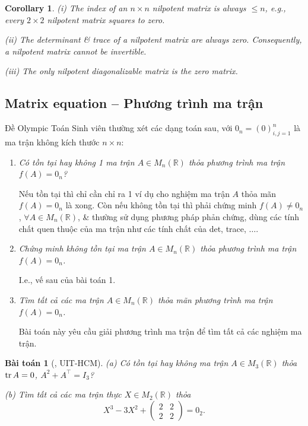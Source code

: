 \documentclass{article}
\newtheorem{baitoan}{Bài toán}
\newtheorem{corollary}{Corollary}
\begin{document}
\begin{corollary}
	(i) The index of an $n\times n$ nilpotent matrix is always $\le n$, e.g., every $2\times2$ nilpotent matrix squares to zero.
	\item(ii) The determinant \& trace of a nilpotent matrix are always zero. Consequently, a nilpotent matrix cannot be invertible.
	\item(iii) The only nilpotent diagonalizable matrix is the zero matrix.
\end{corollary}


\subsection{Matrix equation -- Phương trình ma trận}
Đề Olympic Toán Sinh viên thường xét các dạng toán sau, với $0_n = (0)_{i,j=1}^n$ là ma trận không kích thước $n\times n$:
\begin{enumerate}
	\item {\it Có tồn tại hay không 1 ma trận $A\in M_n(\mathbb{R})$ thỏa phương trình ma trận $f(A) = 0_n$?}
	
	Nếu tồn tại thì chỉ cần chỉ ra 1 ví dụ cho nghiệm ma trận $A$ thỏa mãn $f(A) = 0_n$ là xong. Còn nếu không tồn tại thì phải chứng minh $f(A)\ne0_n$, $\forall A\in M_n(\mathbb{R})$, \& thường sử dụng phương pháp phản chứng, dùng các tính chất quen thuộc của ma trận như các tính chất của det, trace, $\ldots$.
	\item {\it Chứng minh không tồn tại ma trận $A\in M_n(\mathbb{R})$ thỏa phương trình ma trận $f(A) = 0_n$.}
	
	I.e., vế sau của bài toán 1.
	\item {\it Tìm tất cả các ma trận $A\in M_n(\mathbb{R})$ thỏa mãn phương trình ma trận $f(A) = 0_n$.}
	
	Bài toán này yêu cầu giải phương trình ma trận để tìm tất cả các nghiệm ma trận.
\end{enumerate}

\begin{baitoan}[\cite{VMS_VMC2025}, UIT-HCM]
	\item(a) Có tồn tại hay không ma trận $A\in M_3(\mathbb{R})$ thỏa ${\rm tr}\,A = 0$, $A^2 + A^\top = I_3$?
	\item(b) Tìm tất cả các ma trận thực $X\in M_2(\mathbb{R})$ thỏa
	\begin{equation*}
		X^3 - 3X^2 + \begin{pmatrix}
			2 & 2\\2 & 2
		\end{pmatrix} = 0_2.
	\end{equation*}
\end{baitoan}
\end{document}
